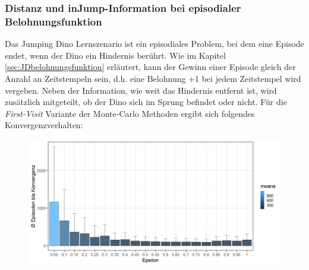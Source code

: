 \subsubsection*{Distanz und \glqq inJump\grqq{}-Information bei episodialer Belohnungsfunktion}
Das Jumping Dino Lernszenario ist ein episodiales Problem, bei dem eine Episode endet, wenn der Dino ein Hindernis berührt. Wie im Kapitel \ref{sec:JDbelohnungsfunktion} erläutert, kann der Gewinn einer Episode gleich der Anzahl an Zeitstempeln sein, d.h. eine Belohnung +1 bei jedem Zeitstempel wird vergeben. Neben der Information, wie weit das Hindernis entfernt ist, wird zusätzlich mitgeteilt, ob der Dino sich im Sprung befindet oder nicht. Für die \textit{First-Visit} Variante der Monte-Carlo Methoden ergibt sich folgendes Konvergenzverhalten:

\begin{figure}[H]
    \centering
    \includegraphics[width=\textwidth]{images/SimpleZ2B1MonteCarloA}
    \label{fig:test1}
\end{figure}

